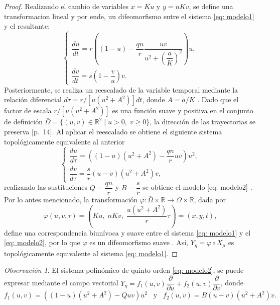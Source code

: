 \documentclass[]{article}
\theoremstyle{remark}
\newtheorem{remark}{Observación}
\begin{document}
	\begin{proof}
		Realizando el cambio de variables $x = K u$ y $y = n K v$, se define una transformacion lineal y por ende, un difeomorfismo entre el sistema \eqref{eq: modelo1} y el resultante:
		\begin{equation*}
			\begin{cases}
				\dfrac{du}{dt} = r\left((1-u) - \dfrac{qn}{r} \dfrac{uv}{u^{2}+\left(\dfrac{a}{K}\right)^{2}}\right)u, \\
				\dfrac{dv}{dt} = s \left(1-\dfrac{v}{u}\right)v.
			\end{cases}
		\end{equation*}
		Posteriormente, se realiza un reescalado de la variable temporal mediante la relación diferencial $d\tau = r/[u(u^2+A^2)]dt $, donde $A = a/K$ \cite{articulo}. Dado que el factor de escala $r/[u(u^2+A^2)]$ es una función suave y positiva en el conjunto de definición $\bar{\Omega} = \{ (u, v) \in \mathbb{R}^{2} \; | \; u > 0, \; v \geq 0 \}$, la dirección de las trayectorias se preserva \cite{chicone}[p.~14]. Al aplicar el reescalado se obtiene el siguiente sistema topológicamente equivalente al anterior
		\begin{equation*}
			\begin{cases}
				\dfrac{du}{d\tau} = \left((1-u)\left(u^{2}+A^{2}\right) - \dfrac{qn}{r} uv\right)u^{2}, \\[5pt]
				\dfrac{dv}{d\tau} = \dfrac{s}{r} \left(u-v\right)\left(u^{2}+A^{2}\right)v,
			\end{cases}
		\end{equation*}
		realizando las sustituciones $Q = \dfrac{qn}{r}$ y $B = \dfrac{s}{r}$ se obtiene el modelo \eqref{eq: modelo2} \cite{articulo}. Por lo antes mencionado, la transformación $\varphi : \bar{\Omega} \times \mathbb{R} \rightarrow \Omega \times \mathbb{R}$, dada por
		\begin{equation*}
			\varphi(u, v, \tau) = \left( Ku, \; nKv, \; \dfrac{u\left(u^{2}+A^{2}\right)}{r} \tau \right) = (x, y, t),
		\end{equation*} define una correspondencia biunívoca y suave entre el sistema \eqref{eq: modelo1} y el \eqref{eq: modelo2}, por lo que $\varphi$ es un difeomorfismo suave \cite{articulo}. Así, $Y_{\eta} = \varphi \circ X_{\mu}$ es topológicamente equivalente al sistema \eqref{eq: modelo1}.
	\end{proof}
	
	\begin{remark}
		El sistema polinómico de quinto orden \eqref{eq: modelo2}, se puede expresar mediante el campo vectorial $Y_{\eta} = f_1(u,v) \dfrac{\partial}{\partial u} + f_2(u,v) \dfrac{\partial}{\partial v}$, donde
		\begin{equation*}
			f_1(u, v) = ((1 - u)(u^{2} + A^{2}) - Q u v)u^{2} \; \; \; \text{y} \; \; \;
			f_2(u, v) = B(u - v)(u^{2} + A^{2})v.
		\end{equation*}
	\end{remark}
	
\end{document}
